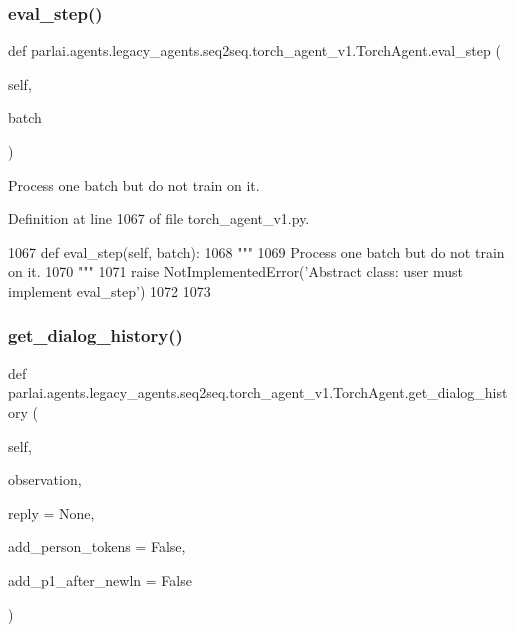 \subsubsection{\texorpdfstring{eval\+\_\+step()}{eval\_step()}}
{\footnotesize\ttfamily def parlai.\+agents.\+legacy\+\_\+agents.\+seq2seq.\+torch\+\_\+agent\+\_\+v1.\+Torch\+Agent.\+eval\+\_\+step (\begin{DoxyParamCaption}\item[{}]{self,  }\item[{}]{batch }\end{DoxyParamCaption})}

\begin{DoxyVerb}Process one batch but do not train on it.
\end{DoxyVerb}
 

Definition at line 1067 of file torch\+\_\+agent\+\_\+v1.\+py.


\begin{DoxyCode}
1067     \textcolor{keyword}{def }eval\_step(self, batch):
1068         \textcolor{stringliteral}{"""}
1069 \textcolor{stringliteral}{        Process one batch but do not train on it.}
1070 \textcolor{stringliteral}{        """}
1071         \textcolor{keywordflow}{raise} NotImplementedError(\textcolor{stringliteral}{'Abstract class: user must implement eval\_step'})
1072 
1073 
\end{DoxyCode}
\mbox{\label{classparlai_1_1agents_1_1legacy__agents_1_1seq2seq_1_1torch__agent__v1_1_1TorchAgent_a8984452b8b4e6194625530aeae49b243}} 
\subsubsection{\texorpdfstring{get\+\_\+dialog\+\_\+history()}{get\_dialog\_history()}}
{\footnotesize\ttfamily def parlai.\+agents.\+legacy\+\_\+agents.\+seq2seq.\+torch\+\_\+agent\+\_\+v1.\+Torch\+Agent.\+get\+\_\+dialog\+\_\+history (\begin{DoxyParamCaption}\item[{}]{self,  }\item[{}]{observation,  }\item[{}]{reply = {\ttfamily None},  }\item[{}]{add\+\_\+person\+\_\+tokens = {\ttfamily False},  }\item[{}]{add\+\_\+p1\+\_\+after\+\_\+newln = {\ttfamily False} }\end{DoxyParamCaption})}

